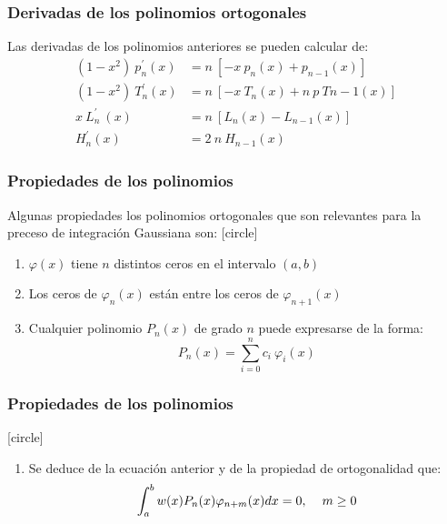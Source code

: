 \begin{frame}
\frametitle{Derivadas de los polinomios ortogonales}
Las derivadas de los polinomios anteriores se pueden calcular de:
\begin{align*}
(1 -x^{2}) \: p^{\prime}_{n}(x) &= n \: [-x \: p_{n}(x) + p_{n - 1}(x) ] \\[1em]
(1 -x^{2}) \: T^{\prime}_{n}(x) &= n \: [-x \: T_{n}(x) + n \: p \: T{n - 1}(x) ] \\[1em]
x \: L^{\prime}_{n} \: (x) &= n \: [ L_{n}(x) - L_{n - 1}(x) ] \\[1em]
H^{\prime}_{n}(x) &= 2 \: n \:  H_{n - 1}(x)
\end{align*}
\end{frame}
\begin{frame}
\frametitle{Propiedades de los polinomios}
Algunas propiedades los polinomios ortogonales que son relevantes para la preceso de integración Gaussiana son:
[circle]
\begin{enumerate}[<+->]
\item $\varphi(x)$ tiene $n$ distintos ceros en el intervalo $(a,b)$
\item Los ceros de $\varphi_{n}(x)$ están entre los ceros de $\varphi_{n+1}(x)$
\item Cualquier polinomio $P_{n}(x)$ de grado $n$ puede expresarse de la forma:
\[ P_{n}(x) =  \sum_{i=0}^{n} c_{i} \: \varphi_{i} (x) \]
\seti
\end{enumerate}
\end{frame}
\begin{frame}
\frametitle{Propiedades de los polinomios}
[circle]
\begin{enumerate}
\conti
\item Se deduce de la ecuación anterior y de la propiedad de ortogonalidad que:
\fontsize{12}{12}\selectfont
\[ \int_{a}^{b} w(x) P_{n}(x) \varphi_{n+m} (x) dx = 0, \hspace{0.4cm} m \geq 0 \]
\end{enumerate}
\end{frame}
